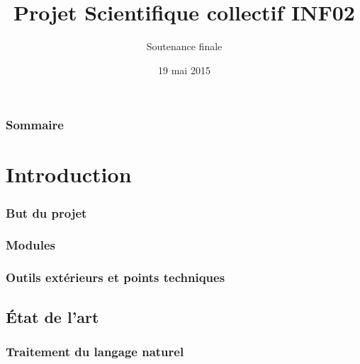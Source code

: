\documentclass[12pt, handout]{beamer}
\title{Projet Scientifique collectif INF02}
\subtitle{Soutenance finale}
\author{}
\date{19 mai 2015}
\begin{document}

    \begin{frame}
      \maketitle
    \end{frame}		


    \begin{frame}
      \frametitle{Sommaire}
      \tableofcontents
    \end{frame}

\section{Introduction}

\begin{frame}
 \frametitle{But du projet}
 

\end{frame}

\begin{frame}
 \frametitle{Modules}
 
 
\end{frame}


\begin{frame}
 \frametitle{Outils extérieurs et points techniques}
 
 
\end{frame}


\subsection{État de l'art}

\begin{frame}
 \frametitle{Traitement du langage naturel}
 
 
\end{frame}
\end{document}
